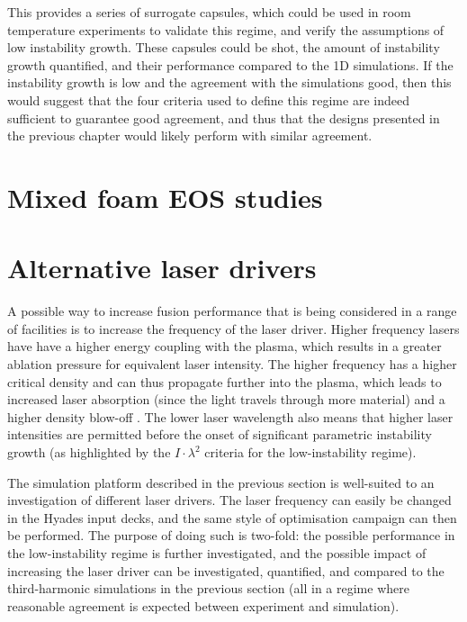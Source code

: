 This provides a series of surrogate capsules, which could be used in room temperature experiments to validate this regime, and verify the assumptions of low instability growth. These capsules could be shot, the amount of instability growth quantified, and their performance compared to the 1D simulations. If the instability growth is low and the agreement with the simulations good, then this would suggest that the four criteria used to define this regime are indeed sufficient to guarantee good agreement, and thus that the designs presented in the previous chapter would likely perform with similar agreement.

\section{Mixed foam EOS studies}






\section{Alternative laser drivers}

A possible way to increase fusion performance that is being considered in a range of facilities is to increase the frequency of the laser driver. Higher frequency lasers have have a higher energy coupling with the plasma, which results in a greater ablation pressure for equivalent laser intensity. The higher frequency has a higher critical density and can thus propagate further into the plasma, which leads to increased laser absorption (since the light travels through more material) and a higher density blow-off \cite{Obenschain2020}. The lower laser wavelength also means that higher laser intensities are permitted before the onset of significant parametric instability growth \cite{Montgomery2016} (as highlighted by the $I \cdot \lambda^2$ criteria for the low-instability regime). 

The simulation platform described in the previous section is well-suited to an investigation of different laser drivers. The laser frequency can easily be changed in the Hyades input decks, and the same style of optimisation campaign can then be performed. The purpose of doing such is two-fold: the possible performance in the low-instability regime is further investigated, and the possible impact of increasing the laser driver can be investigated, quantified, and compared to the third-harmonic simulations in the previous section (all in a regime where reasonable agreement is expected between experiment and simulation).

